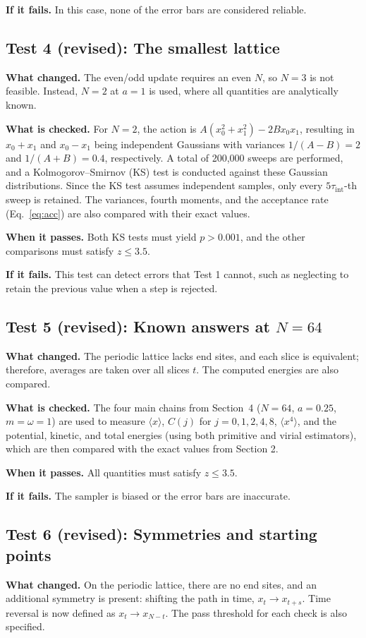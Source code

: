 \documentclass[11pt]{article}
\begin{document}
\textbf{If it fails.} In this case, none of the error bars are considered reliable.

\subsection*{Test 4 (revised): The smallest lattice}
\textbf{What changed.} The even/odd update requires an even $N$, so $N = 3$ is not feasible. Instead, $N = 2$ at $a = 1$ is used, where all quantities are analytically known.

\textbf{What is checked.} For $N = 2$, the action is $A(x_0^2 + x_1^2) - 2Bx_0x_1$, resulting in $x_0 + x_1$ and $x_0 - x_1$ being independent Gaussians with variances $1/(A-B) = 2$ and $1/(A+B) = 0.4$, respectively. A total of 200,000 sweeps are performed, and a Kolmogorov--Smirnov (KS) test is conducted against these Gaussian distributions. Since the KS test assumes independent samples, only every $5\tau_{\text{int}}$-th sweep is retained. The variances, fourth moments, and the acceptance rate (Eq.~\eqref{eq:acc}) are also compared with their exact values.

\textbf{When it passes.} Both KS tests must yield $p > 0.001$, and the other comparisons must satisfy $z \le 3.5$.

\textbf{If it fails.} This test can detect errors that Test 1 cannot, such as neglecting to retain the previous value when a step is rejected.

\subsection*{Test 5 (revised): Known answers at $N = 64$}
\textbf{What changed.} The periodic lattice lacks end sites, and each slice is equivalent; therefore, averages are taken over all slices $t$. The computed energies are also compared.

\textbf{What is checked.} The four main chains from Section~4 ($N = 64$, $a = 0.25$, $m = \omega = 1$) are used to measure $\langle x\rangle$, $C(j)$ for $j = 0, 1, 2, 4, 8$, $\langle x^4\rangle$, and the potential, kinetic, and total energies (using both primitive and virial estimators), which are then compared with the exact values from Section 2.

\textbf{When it passes.} All quantities must satisfy $z \le 3.5$.

\textbf{If it fails.} The sampler is biased or the error bars are inaccurate.

\subsection*{Test 6 (revised): Symmetries and starting points}
\textbf{What changed.} On the periodic lattice, there are no end sites, and an additional symmetry is present: shifting the path in time, $x_t \to x_{t+s}$. Time reversal is now defined as $x_t \to x_{N-t}$. The pass threshold for each check is also specified.
\end{document}
